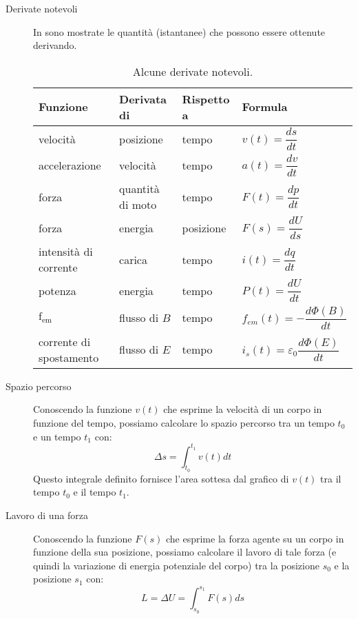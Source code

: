 \documentclass[a4paper,11pt,italian]{article}
\begin{document}
\begin{description}
  \item[Derivate notevoli]
  In  sono mostrate le quantità (istantanee) che possono essere ottenute derivando.
  
  \begin{table}[hbtp]\centering
  \begin{tabular}{llll}\toprule
    \textbf{Funzione} & \textbf{Derivata di} & \textbf{Rispetto a} & \textbf{Formula} \\\midrule
    velocità          & posizione            & tempo               & $ v(t) = \dfrac{ds}{dt} $ \\\addlinespace[.8em]
    accelerazione     & velocità             & tempo               & $ a(t) = \dfrac{dv}{dt} $ \\\addlinespace[.8em]
    forza             & quantità di moto     & tempo               & $ F(t) = \dfrac{dp}{dt} $ \\\addlinespace[.8em]
    forza             & energia              & posizione           & $ F(s) = \dfrac{dU}{ds} $ \\\addlinespace[.8em]
    intensità di corrente & carica           & tempo               & $ i(t) = \dfrac{dq}{dt} $ \\\addlinespace[.8em]
    potenza           & energia              & tempo               & $ P(t) = \dfrac{dU}{dt} $ \\\addlinespace[.8em]
    $ \textrm{f}_{\textrm{em}} $ & flusso di $ B $ & tempo         & $ f_{em}(t) = -\dfrac{d\Phi(B)}{dt} $ \\\addlinespace[.8em]
    corrente di spostamento & flusso di $ E $ & tempo         & $ i_s(t) = \varepsilon_0 \dfrac{d\Phi(E)}{dt} $ \\\bottomrule
  \end{tabular}
  \caption{Alcune derivate notevoli.}
  \label{tab:derivatenotevoli}
  \end{table}
  
  \item[Spazio percorso]
  Conoscendo la funzione $ v(t) $ che esprime la velocità di un corpo in funzione del tempo, 
  possiamo calcolare lo spazio percorso tra un tempo $ t_0 $ e un tempo $ t_1 $ con:
  \[ \Delta s = \int_{t_0}^{t_1} v(t) dt \]
  Questo integrale definito fornisce l'area sottesa dal grafico di $ v(t) $ tra il tempo $ t_0 $ e il tempo $ t_1 $.
  
  \item[Lavoro di una forza]
  Conoscendo la funzione $ F(s) $ che esprime la forza agente su un corpo in funzione della sua posizione, 
  possiamo calcolare il lavoro di tale forza (e quindi la variazione di energia potenziale del corpo) tra la posizione $ s_0 $ e la posizione $ s_1 $ con:
  \[ L = \Delta U = \int_{s_0}^{s_1} F(s) ds \]
  

\end{description}
\end{document}
